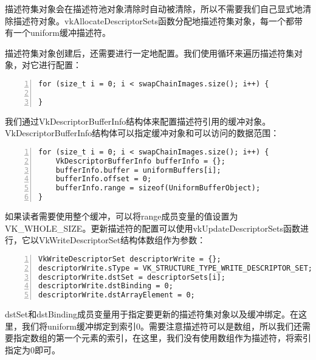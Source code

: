 \documentclass{ctexart}
\begin{document}
描述符集对象会在描述符池对象清除时自动被清除，所以不需要我们自己显式地清除描述符对象。vkAllocateDescriptorSets函数分配地描述符集对象，每一个都带有一个uniform缓冲描述符。

描述符集对象创建后，还需要进行一定地配置。我们使用循环来遍历描述符集对象，对它进行配置：

\begin{lstlisting}[language={[ANSI]C},keywordstyle=\color{blue!70},commentstyle=\color{red!50!green!50!blue!50},frame=shadowbox, rulesepcolor=\color{red!20!green!20!blue!20},basicstyle=\small,numbers=left, numberstyle=\tiny,breaklines=true]
for (size_t i = 0; i < swapChainImages.size(); i++) {

}
\end{lstlisting}

我们通过VkDescriptorBufferInfo结构体来配置描述符引用的缓冲对象。VkDescriptorBufferInfo结构体可以指定缓冲对象和可以访问的数据范围：

\begin{lstlisting}[language={[ANSI]C},keywordstyle=\color{blue!70},commentstyle=\color{red!50!green!50!blue!50},frame=shadowbox, rulesepcolor=\color{red!20!green!20!blue!20},basicstyle=\small,numbers=left, numberstyle=\tiny,breaklines=true]
for (size_t i = 0; i < swapChainImages.size(); i++) {
	VkDescriptorBufferInfo bufferInfo = {};
	bufferInfo.buffer = uniformBuffers[i];
	bufferInfo.offset = 0;
	bufferInfo.range = sizeof(UniformBufferObject);
}
\end{lstlisting}

如果读者需要使用整个缓冲，可以将range成员变量的值设置为VK\_WHOLE\_SIZE。更新描述符的配置可以使用vkUpdateDescriptorSets函数进行，它以VkWriteDescriptorSet结构体数组作为参数：

\begin{lstlisting}[language={[ANSI]C},keywordstyle=\color{blue!70},commentstyle=\color{red!50!green!50!blue!50},frame=shadowbox, rulesepcolor=\color{red!20!green!20!blue!20},basicstyle=\small,numbers=left, numberstyle=\tiny,breaklines=true]
VkWriteDescriptorSet descriptorWrite = {};
descriptorWrite.sType = VK_STRUCTURE_TYPE_WRITE_DESCRIPTOR_SET;
descriptorWrite.dstSet = descriptorSets[i];
descriptorWrite.dstBinding = 0;
descriptorWrite.dstArrayElement = 0;
\end{lstlisting}

dstSet和dstBinding成员变量用于指定要更新的描述符集对象以及缓冲绑定。在这里，我们将uniform缓冲绑定到索引0。需要注意描述符可以是数组，所以我们还需要指定数组的第一个元素的索引，在这里，我们没有使用数组作为描述符，将索引指定为0即可。
\end{document}
